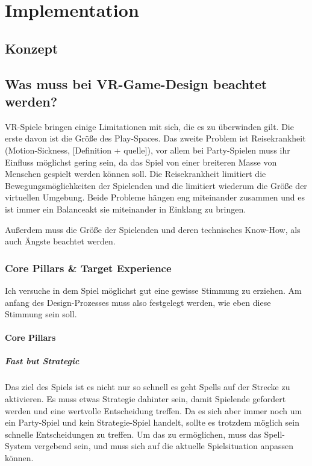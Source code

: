 \chapter{Implementation}

\section{Konzept}

\section{Was muss bei VR-Game-Design beachtet werden?}

VR-Spiele bringen einige Limitationen mit sich, die es zu überwinden gilt. Die erste davon ist die Größe des Play-Spaces. Das zweite Problem ist Reisekrankheit (Motion-Sickness, [Definition + quelle]), vor allem bei Party-Spielen muss ihr Einfluss möglichst gering sein, da das Spiel von einer breiteren Masse von Menschen gespielt werden können soll. Die Reisekrankheit limitiert die Bewegungsmöglichkeiten der Spielenden und die limitiert wiederum die Größe der virtuellen Umgebung. Beide Probleme hängen eng miteinander zusammen und es ist immer ein Balanceakt sie miteinander in Einklang zu bringen. 

Außerdem muss die Größe der Spielenden und deren technisches Know-How, als auch Ängste beachtet werden. 

\subsection{Core Pillars \& Target Experience}

Ich versuche in dem Spiel möglichst gut eine gewisse Stimmung zu erziehen. Am anfang des Design-Prozesses muss also festgelegt werden, wie eben diese Stimmung sein soll.

\subsubsection{Core Pillars}

\paragraph{Fast but Strategic}
Das ziel des Spiels ist es nicht nur so schnell es geht Spells auf der Strecke zu aktivieren. Es muss etwas Strategie dahinter sein, damit Spielende gefordert werden und eine wertvolle Entscheidung treffen. Da es sich aber immer noch um ein Party-Spiel und kein Strategie-Spiel handelt, sollte es trotzdem möglich sein schnelle Entscheidungen zu treffen. Um das zu ermöglichen, muss das Spell-System vergebend sein, und muss sich auf die aktuelle Spielsituation anpassen können. 

